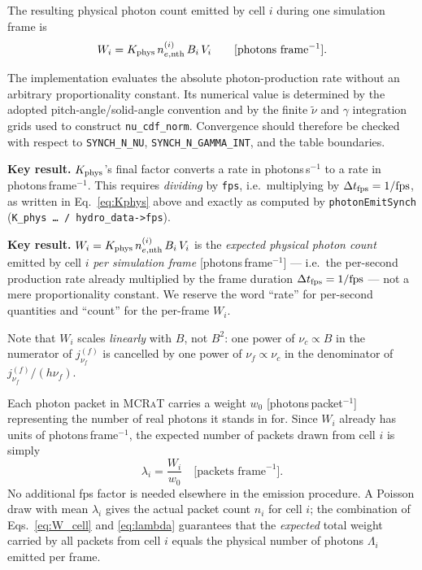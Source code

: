 \documentclass[12pt,a4paper]{article}
\newcommand{\nuf}{\nu_{\!f}}
\newcommand{\nuc}{\nu_c}
\newcommand{\nenth}{n_{e,\mathrm{nth}}}
\newcommand{\code}[1]{\texttt{#1}}
\newcommand{\mcrat}{\textsc{MCRaT}}
\newenvironment{keyresult}{%
	\begin{framed}\noindent\textbf{Key result.}\quad}
	{\end{framed}}
\begin{document}
The resulting physical photon count emitted by cell \(i\) during one
simulation frame is
\begin{equation}
	W_i
	=
	K_{\rm phys}\,
	n_{e,\mathrm{nth}}^{(i)}\,
	B_i\,
	V_i
	\qquad
	[\mathrm{photons\ frame^{-1}}].
	\label{eq:W_cell}
\end{equation}

The implementation evaluates the absolute photon-production rate without
an arbitrary proportionality constant. Its numerical value is determined
by the adopted pitch-angle/solid-angle convention and by the finite
$\tilde{\nu}$ and $\gamma$ integration grids used to construct
\code{nu\_cdf\_norm}. Convergence should therefore be checked with respect
to \code{SYNCH\_N\_NU}, \code{SYNCH\_N\_GAMMA\_INT}, and the table
boundaries.

\begin{keyresult}
	$K_{\rm phys}$'s final factor converts a rate in photons\,s$^{-1}$ to a
	rate in photons\,frame$^{-1}$. This requires \emph{dividing} by
	\code{fps}, i.e.\ multiplying by $\Delta t_{\rm fps} = 1/\mathrm{fps}$,
	as written in Eq.~\eqref{eq:Kphys} above and exactly as computed by
	\texttt{photonEmitSynch} (\texttt{K\_phys \ldots\ / hydro\_data->fps}).
\end{keyresult}

\begin{keyresult}
	\(W_i = K_{\rm phys}\,\nenth^{(i)}\,B_i\,V_i\) is the \emph{expected physical
		photon count} emitted by cell \(i\) \emph{per simulation frame}
	[photons\,frame$^{-1}$] --- i.e.\ the per-second production rate already
	multiplied by the frame duration $\Delta t_{\rm fps}=1/\mathrm{fps}$ --- not
	a mere proportionality constant. We reserve the word ``rate'' for
	per-second quantities and ``count'' for the per-frame $W_i$.
	
	Note that \(W_i\) scales \emph{linearly} with
	\(B\), not \(B^2\): one power of \(\nuc \propto B\) in the numerator of
	\(j_{\nuf}^{(f)}\) is cancelled by one power of \(\nuf \propto \nuc\) in
	the denominator of \(j_{\nuf}^{(f)}/(h\nuf)\).
\end{keyresult}

Each photon packet in \mcrat{} carries a weight \(w_0\)
[photons\,packet\(^{-1}\)] representing the number of real photons it
stands in for. Since \(W_i\) already has units of
photons\,frame\(^{-1}\), the expected number of packets drawn from cell
\(i\) is simply
\begin{equation}
	\lambda_i = \frac{W_i}{w_0}
	\quad
	\bigl[\text{packets frame}^{-1}\bigr].
	\label{eq:lambda}
\end{equation}
No additional fps factor is needed elsewhere in the emission procedure.
A Poisson draw with mean \(\lambda_i\) gives the actual packet count
\(n_i\) for cell \(i\); the combination of Eqs.~\eqref{eq:W_cell} and
\eqref{eq:lambda} guarantees that the \emph{expected} total weight
carried by all packets from cell \(i\) equals the physical number of
photons \(\Lambda_i\) emitted per frame.
\end{document}
